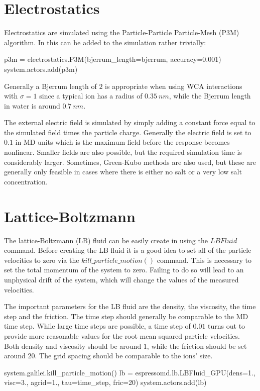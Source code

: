 \documentclass[
paper=a4,                       %
fontsize=11pt,                  %
twoside,                        %
footsepline,                    %
headsepline,                    %
headinclude=false,              %
footinclude=false,              %
pagesize,                       %
]{scrartcl}
\begin{document}
\section{Electrostatics}
Electrostatics are simulated using the Particle-Particle Particle-Mesh (P3M) algorithm. In \es{} this can be added to the simulation rather trivially:
{\small\vspace{0,2cm}
\begin{pypresso}[numbers=none]
p3m = electrostatics.P3M(bjerrum_length=bjerrum, accuracy=0.001)
system.actors.add(p3m)
\end{pypresso}
}
Generally a Bjerrum length of $2$ is appropriate when using WCA interactions with $\sigma=1$ since a typical ion has a radius of $\SI{0.35}{nm}$, while the Bjerrum
length in water is around $\SI{0.7}{nm}$.

The external electric field is simulated by simply adding a constant force equal to the simulated field times the particle charge. Generally the electric field is set to $0.1$ in MD units
which is the maximum field before the response becomes nonlinear. Smaller fields are also possible, but the required simulation time is considerably larger. Sometimes, Green-Kubo methods
are also used, but these are generally only feasible in cases where there is either no salt or a very low salt concentration.

\section{Lattice-Boltzmann}
The lattice-Boltzmann (LB) fluid can be easily create in \es{} using the $LBFluid$ command.
Before creating the LB fluid it is a good idea to set all of the particle velocities to zero via the $kill\_particle\_motion()$ command.
This is necessary to set the total momentum of the system to zero. Failing to do so will lead to an unphysical drift of the system, which
will change the values of the measured velocities.

The important parameters for the LB fluid are the density, the viscosity, the time step and the friction. The time step should generally be comparable to the MD time step. While
large time steps are possible, a time step of $0.01$ turns out to provide more reasonable values for the root mean squared particle velocities. Both density and viscosity
should be around $1$, while the friction should be set around $20.$ The grid spacing should be comparable to the ions' size.
{\small\vspace{0,2cm}
\begin{pypresso}[numbers=none]
system.galilei.kill_particle_motion()
lb = espressomd.lb.LBFluid_GPU(dens=1., visc=3., agrid=1., tau=time_step, fric=20)
system.actors.add(lb)
\end{pypresso}
}
\end{document}
